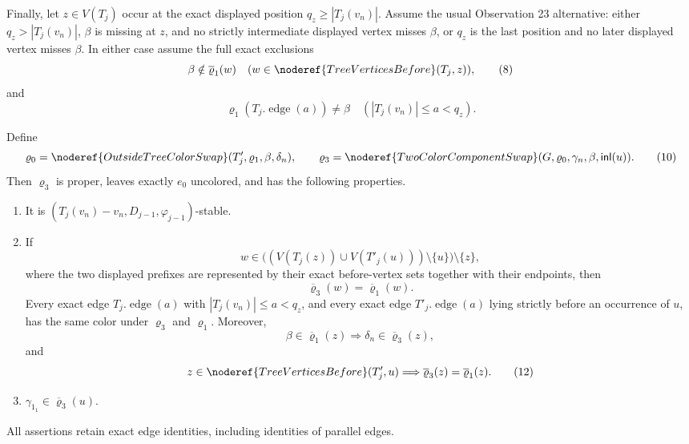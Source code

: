 \begin{lemma}
Finally, let \(z\in V(T_j)\) occur at the exact displayed position
\(q_z\ge |T_j(v_n)|\).  Assume the usual Observation 23 alternative:
either \(q_z>|T_j(v_n)|\), \(\beta\) is missing at \(z\), and no strictly
intermediate displayed vertex misses \(\beta\), or \(q_z\) is the last
position and no later displayed vertex misses \(\beta\).  In either case
assume the full exact exclusions
\[
 \beta\notin\overline{\varrho}_1(w)
 \quad(w\in\noderef{TreeVerticesBefore}(T_j,z)),               \tag{8}
\]
and
\[
 \varrho_1(T_j.\operatorname{edge}(a))\ne\beta
 \quad(|T_j(v_n)|\le a<q_z).                                  \tag{9}
\]

Define
\[
 \varrho_0=\noderef{OutsideTreeColorSwap}
   (T'_j,\varrho_1,\beta,\delta_n),\qquad
 \varrho_3=\noderef{TwoColorComponentSwap}
   (G,\varrho_0,\gamma_n,\beta,\mathsf{inl}(u)).               \tag{10}
\]
Then \(\varrho_3\) is proper, leaves exactly \(e_0\) uncolored, and has
the following properties.
\begin{enumerate}
\item[(d1)] It is
\((T_j(v_n)-v_n,D_{j-1},\varphi_{j-1})\)-stable.
\item[(d2)] If
\[
 w\in
 \bigl((V(T_j(z))\cup V(T'_j(u)))\setminus\{u\}\bigr)
       \setminus\{z\},
\]
where the two displayed prefixes are represented by their exact
before-vertex sets together with their endpoints, then
\[
 \overline{\varrho}_3(w)=\overline{\varrho}_1(w).
\]
Every exact edge \(T_j.\operatorname{edge}(a)\) with
\(|T_j(v_n)|\le a<q_z\), and every exact edge
\(T'_j.\operatorname{edge}(a)\) lying strictly before an occurrence of
\(u\), has the same color under \(\varrho_3\) and \(\varrho_1\).
Moreover,
\[
 \beta\in\overline{\varrho}_1(z)
 \Longrightarrow \delta_n\in\overline{\varrho}_3(z),          \tag{11}
\]
and
\[
 z\in\noderef{TreeVerticesBefore}(T'_j,u)
 \Longrightarrow
 \overline{\varrho}_3(z)=\overline{\varrho}_1(z).              \tag{12}
\]
\item[(d3)] \(\gamma_{1_1}\in\overline{\varrho}_3(u)\).
\end{enumerate}
All assertions retain exact edge identities, including identities of
parallel edges.
\end{lemma}
